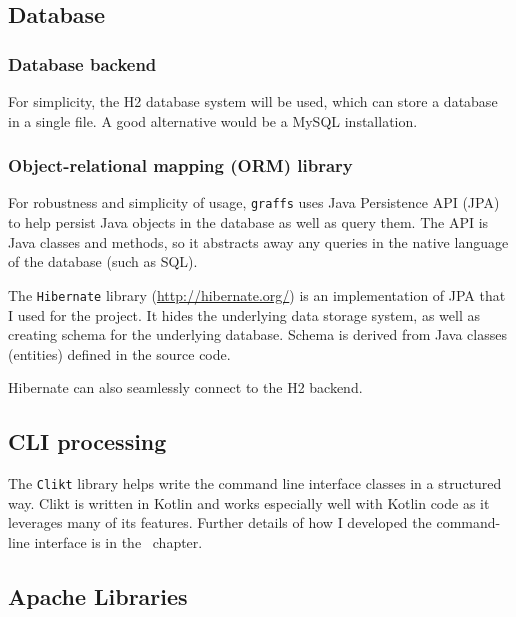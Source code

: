 
\subsection{Database}

\subsubsection{Database backend}

For simplicity, the H2 database system will be used, which can store a database in a single file.
A good alternative would be a MySQL installation.

\subsubsection{Object-relational mapping (ORM) library}

For robustness and simplicity of usage, \texttt{graffs} uses Java Persistence API (JPA) to help persist Java objects in the database as well as query them.
The API is Java classes and methods, so it abstracts away any queries in the native language of the database (such as SQL).

The \texttt{Hibernate} library (\url{http://hibernate.org/}) is an implementation of JPA that I used for the project.
It hides the underlying data storage system, as well as creating schema for the underlying database.
Schema is derived from Java classes (entities) defined in the source code.

Hibernate can also seamlessly connect to the H2 backend.

\subsection{CLI processing}

The \texttt{Clikt} library helps write the command line interface classes in a structured way.
Clikt is written in Kotlin and works especially well with Kotlin code as it leverages many of its features.
Further details of how I developed the command-line interface is in the~ chapter.

\subsection{Apache Libraries}

